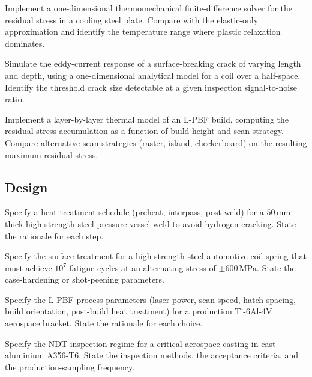 \begin{exercise}
Implement a one-dimensional thermomechanical finite-difference
solver for the residual stress in a cooling steel plate. Compare
with the elastic-only approximation and identify the temperature
range where plastic relaxation dominates.
\end{exercise}

\begin{exercise}
Simulate the eddy-current response of a surface-breaking crack of
varying length and depth, using a one-dimensional analytical model
for a coil over a half-space. Identify the threshold crack size
detectable at a given inspection signal-to-noise ratio.
\end{exercise}

\begin{exercise}
Implement a layer-by-layer thermal model of an L-PBF build, computing
the residual stress accumulation as a function of build height and
scan strategy. Compare alternative scan strategies (raster, island,
checkerboard) on the resulting maximum residual stress.
\end{exercise}

\subsection*{Design}

\begin{exercise}
Specify a heat-treatment schedule (preheat, interpass, post-weld)
for a $50\,\text{mm}$-thick high-strength steel pressure-vessel weld
to avoid hydrogen cracking. State the rationale for each step.
\end{exercise}

\begin{exercise}
Specify the surface treatment for a high-strength steel automotive
coil spring that must achieve $10^7$ fatigue cycles at an alternating
stress of $\pm 600\,\text{MPa}$. State the case-hardening or
shot-peening parameters.
\end{exercise}

\begin{exercise}
Specify the L-PBF process parameters (laser power, scan speed, hatch
spacing, build orientation, post-build heat treatment) for a
production Ti-6Al-4V aerospace bracket. State the rationale for
each choice.
\end{exercise}

\begin{exercise}
Specify the NDT inspection regime for a critical aerospace casting
in cast aluminium A356-T6. State the inspection methods, the
acceptance criteria, and the production-sampling frequency.
\end{exercise}


